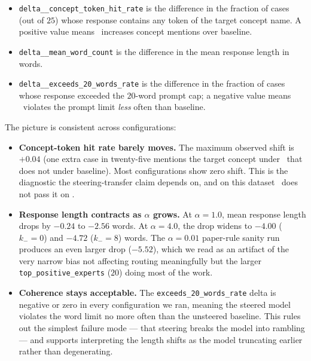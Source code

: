 \begin{itemize}
  \item \texttt{delta\_\_concept\_token\_hit\_rate} is the difference in the
  fraction of cases (out of $25$) whose response contains any token of the
  target concept name. A positive value means \steermoe~increases concept
  mentions over baseline.
  \item \texttt{delta\_\_mean\_word\_count} is the difference in the mean
  response length in words.
  \item \texttt{delta\_\_exceeds\_20\_words\_rate} is the difference in the
  fraction of cases whose response exceeded the $20$-word prompt cap; a
  negative value means \steermoe~violates the prompt limit \emph{less} often
  than baseline.
\end{itemize}



The picture is consistent across configurations:

\begin{itemize}
  \item \textbf{Concept-token hit rate barely moves.} The maximum observed
  shift is $+0.04$ (one extra case in twenty-five mentions the target concept
  under \steermoe~that does not under baseline). Most configurations show
  zero shift. This is the diagnostic the steering-transfer claim depends on,
  and on this dataset \steermoe~does not pass it on \mixtral.
  \item \textbf{Response length contracts as $\alpha$ grows.} At
  $\alpha = 1.0$, mean response length drops by $-0.24$ to $-2.56$ words.
  At $\alpha = 4.0$, the drop widens to $-4.00$ ($k_- = 0$) and $-4.72$
  ($k_- = 8$) words. The $\alpha = 0.01$ paper-rule sanity run produces an
  even larger drop ($-5.52$), which we read as an artifact of the very narrow
  bias not affecting routing meaningfully but the larger
  \texttt{top\_positive\_experts} ($20$) doing most of the work.
  \item \textbf{Coherence stays acceptable.} The
  \texttt{exceeds\_20\_words\_rate} delta is negative or zero in every
  configuration we ran, meaning the steered model violates the word limit
  no more often than the unsteered baseline. This rules out the simplest
  failure mode --- that steering breaks the model into rambling --- and
  supports interpreting the length shifts as the model truncating earlier
  rather than degenerating.
\end{itemize}

